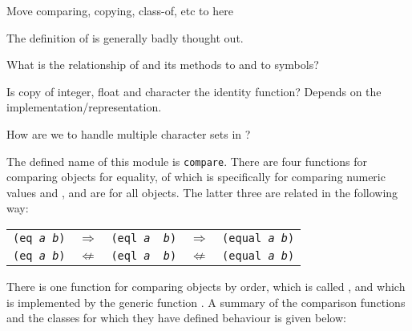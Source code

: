 \label{compare}
%
\begin{optPrivate}
    Move comparing, copying, class-of, etc to here

    The definition of \functionref{=} is generally badly thought out.

    What is the relationship of  and its methods to
     and to symbols?

    Is copy of integer, float and character the identity function?  Depends on
    the implementation/representation.

    How are we to handle multiple character sets in ?
\end{optPrivate}
%
\begin{optDefinition}
%
The defined name of this module is {\tt compare}.  There are four functions for
comparing objects for equality, of which \functionref{=} is specifically for
comparing numeric values and ,  and
 are for all objects.  The latter three are related in the
following way:
%
\begin{center}
\begin{tabular}{rcccl}
    {\tt (eq {\em a} {\em b})} & $\Rightarrow$ & {\tt (eql {\em a} {\em
            b})} & $\Rightarrow$ & {\tt (equal {\em a} {\em b})}\\
    {\tt (eq {\em a} {\em b})} & $\not\Leftarrow$ & {\tt (eql {\em a} {\em
            b})} & $\not\Leftarrow$ & {\tt (equal {\em a} {\em b})}\\
\end{tabular}
\end{center}
%
There is one function for comparing objects by order, which is called
\functionref{<}, and which is implemented by the generic function
.  A summary of the comparison functions and the classes for
which they have defined behaviour is given below:


\end{optDefinition}
